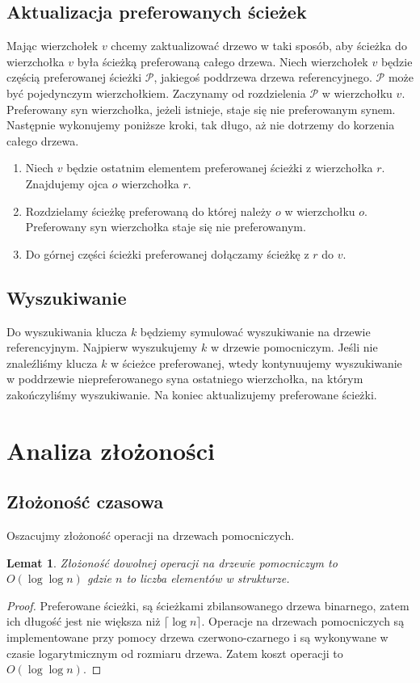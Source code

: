 \documentclass[declaration,shortabstract]{iithesis}
\newcounter{thm}[section]
\theoremstyle{thm}
\theoremstyle{remark}
\theoremstyle{plain}
\theoremstyle{plain}
\theoremstyle{plain}
\newtheorem{lemma}[thm]{Lemat}
\begin{document}
\subsection{Aktualizacja preferowanych ścieżek} Mając wierzchołek $v$ chcemy zaktualizować drzewo w taki sposób, aby ścieżka do wierzchołka $v$ była ścieżką preferowaną całego drzewa. Niech wierzchołek $v$ będzie częścią preferowanej ścieżki \(\mathcal{P}\), jakiegoś poddrzewa drzewa referencyjnego. \(\mathcal{P}\) może być pojedynczym wierzchołkiem. Zaczynamy od rozdzielenia \(\mathcal{P}\) w wierzchołku $v$. Preferowany syn wierzchołka, jeżeli istnieje, staje się nie preferowanym synem. Następnie wykonujemy poniższe kroki, tak długo, aż nie dotrzemy do korzenia całego drzewa. 
\begin{enumerate} 
\item{Niech $v$ będzie ostatnim elementem preferowanej ścieżki z wierzchołka $r$. Znajdujemy ojca $o$ wierzchołka $r$.} 
\item{Rozdzielamy ścieżkę preferowaną do której należy $o$ w wierzchołku $o$. Preferowany syn wierzchołka staje się nie preferowanym.} 
\item{Do górnej części ścieżki preferowanej dołączamy ścieżkę z $r$ do $v$.} 
\end{enumerate} 
\subsection{Wyszukiwanie} Do wyszukiwania klucza $k$ będziemy symulować wyszukiwanie na drzewie referencyjnym. Najpierw wyszukujemy $k$ w drzewie pomocniczym. Jeśli nie znaleźliśmy klucza $k$ w ścieżce preferowanej, wtedy kontynuujemy wyszukiwanie w poddrzewie niepreferowanego syna ostatniego wierzchołka, na którym zakończyliśmy wyszukiwanie. Na koniec aktualizujemy preferowane ścieżki. 
\section{Analiza złożoności} 
\subsection{Złożoność czasowa} Oszacujmy złożoność operacji na drzewach pomocniczych. 
\begin{lemma} 
\label{Pref_cost} 
Złożoność dowolnej operacji na drzewie pomocniczym to \( O(\log \log n)\) gdzie $n$ to liczba elementów w strukturze. 
\end{lemma} 
\begin{proof} 
Preferowane ścieżki, są ścieżkami zbilansowanego drzewa binarnego, zatem ich długość jest nie większa niż \(\lceil \log n \rceil\). Operacje na drzewach pomocniczych są implementowane przy pomocy drzewa czerwono-czarnego i są wykonywane w czasie logarytmicznym od rozmiaru drzewa. Zatem koszt operacji to \( O(\log\log n)\). 
\end{proof}  
\end{document}
